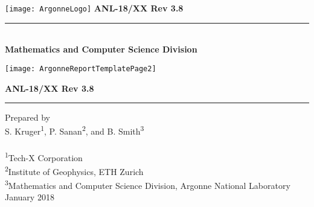 %
%



\def\shortintro{false}

\usepackage{fancyhdr,lastpage}
\pagestyle{fancy}



\pagestyle{empty}
\hspace{-.65in}\texttt{[image: ArgonneLogo]}
\hfill  {\large {\bf ANL-18/XX Rev 3.8}}

\vspace*{2in}
\vspace*{8pt}
\hrule
\vspace*{8pt}

\vspace*{1in}
\noindent \\
{\Large {\bf Mathematics and Computer Science Division}}

\vspace*{10pt}
\vspace*{20pt}



\newpage
\centerline{\texttt{[image: ArgonneReportTemplatePage2]}}
\newpage

\hfill {\large {\bf ANL-18/XX Rev 3.8}}

\vspace*{2in}
\vspace*{8pt}
\hrule
\vspace*{8pt}

\vspace*{0.5in}
\noindent Prepared by \\
{S. Kruger\textsuperscript{1}, P. Sanan\textsuperscript{2}, and B. Smith\textsuperscript{3}}\\
\\
\textsuperscript{1}Tech-X Corporation \\
\textsuperscript{2}Institute of Geophysics, ETH Zurich\\
\textsuperscript{3}Mathematics and Computer Science Division, Argonne National Laboratory \\

\vspace*{30pt}
\noindent January 2018

